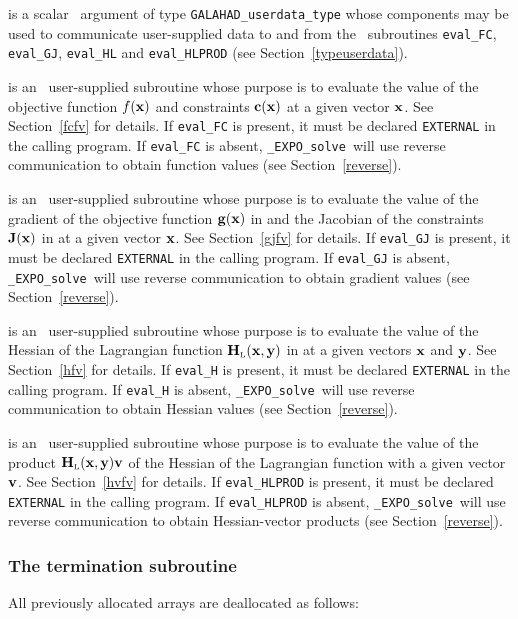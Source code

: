 \documentclass{galahad}
\newcommand{\packagename}{EXPO}
\newcommand{\fullpackagename}{\libraryname\_\packagename}
\newcommand{\solver}{{\tt \fullpackagename\_solve}}
\newcommand{\bmHL}{\bmH\sub{L}}
\begin{document}
\begin{description}
 is a scalar \intentinout\ argument of type
{\tt GALAHAD\_userdata\_type} whose components may be used
to communicate user-supplied data to and from the
\optional\ subroutines
{\tt eval\_FC}, {\tt eval\_GJ},
{\tt eval\_HL} and {\tt eval\_HLPROD}
(see Section~\ref{typeuserdata}).

 is an \optional\
user-supplied subroutine whose purpose is to evaluate the value of the
objective function $f({\mathbf{x}})$ and constraints ${\mathbf{c}}({\mathbf{x}})$ at a given 
vector ${\mathbf{x}}$. See Section~\ref{fcfv} for details.
If {\tt eval\_FC} is present,
it must be declared {\tt EXTERNAL} in the calling program.
If {\tt eval\_FC} is absent, \solver\ will use reverse communication to
obtain function values (see Section~\ref{reverse}).

 is an \optional\
user-supplied subroutine whose purpose is to evaluate the value of the
gradient of the objective function ${\mathbf{g}}({\mathbf{x}})$ in 
and the Jacobian of the constraints ${\mathbf{J}}({\mathbf{x}})$ in \req{J}
at a given vector ${\mathbf{x}}$. See Section~\ref{gjfv} for details.
If {\tt eval\_GJ} is present,
it must be declared {\tt EXTERNAL} in the calling program.
If {\tt eval\_GJ} is absent, \solver\ will use reverse communication to
obtain gradient values (see Section~\ref{reverse}).

 is an \optional\
user-supplied subroutine whose purpose is to evaluate the value of the
Hessian of the Lagrangian function $\bmHL(\bmx,\bmy)$ in 
at a given vectors ${\mathbf{x}}$ and ${\mathbf{y}}$. See Section~\ref{hfv} for details.
If {\tt eval\_H} is present,
it must be declared {\tt EXTERNAL} in the calling program.
If {\tt eval\_H} is absent, \solver\ will use reverse communication to
obtain Hessian values (see Section~\ref{reverse}).

\itt{eval\_HLPROD} is an \optional\
user-supplied subroutine whose purpose is to evaluate the value of the
product $\bmHL(\bmx,\bmy) \bmv$ of the Hessian of the Lagrangian function
 with a given vector ${\mathbf{v}}$. See Section~\ref{hvfv} for details.
If {\tt eval\_HLPROD} is present,
it must be declared {\tt EXTERNAL} in the calling program.
If {\tt eval\_HLPROD} is absent, \solver\ will use reverse communication to
obtain Hessian-vector products (see Section~\ref{reverse}).

\end{description}


\subsubsection{The  termination subroutine}
All previously allocated arrays are deallocated as follows:
\vspace*{1mm}
\end{document}
